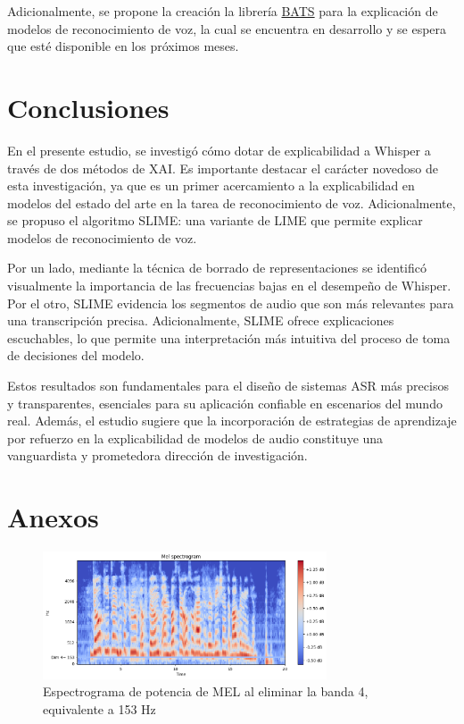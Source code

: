 \documentclass[conference]{IEEEtran}
\begin{document}
Adicionalmente, se propone la creación la librería \href{https://github.com/diegoquezadac/BATS}{BATS} para la explicación de modelos de reconocimiento de voz, la cual se encuentra en desarrollo y se espera que esté disponible en los próximos meses.

\section{Conclusiones} \label{8-Conclusions}

En el presente estudio, se investigó cómo dotar de explicabilidad a Whisper a través de dos métodos de XAI. Es importante destacar el carácter novedoso de esta investigación, ya que es un primer acercamiento a la explicabilidad en modelos del estado del arte en la tarea de reconocimiento de voz. Adicionalmente, se propuso el algoritmo SLIME: una variante de LIME que permite explicar modelos de reconocimiento de voz.

Por un lado, mediante la técnica de borrado de representaciones se identificó visualmente la importancia de las frecuencias bajas en el desempeño de Whisper. Por el otro, SLIME evidencia los segmentos de audio que son más relevantes para una transcripción precisa. Adicionalmente, SLIME ofrece explicaciones escuchables, lo que permite una interpretación más intuitiva del proceso de toma de decisiones del modelo.

Estos resultados son fundamentales para el diseño de sistemas ASR más precisos y transparentes, esenciales para su aplicación confiable en escenarios del mundo real. Además, el estudio sugiere que la incorporación de estrategias de aprendizaje por refuerzo en la explicabilidad de modelos de audio constituye una vanguardista y prometedora dirección de investigación.

\printbibliography

\section{Anexos} \label{9-Anexos}
\begin{figure}[h]
\centering
\includegraphics[width=0.75\textwidth]{images/dim_4_erasured.png}
\caption{Espectrograma de potencia de MEL al eliminar la banda 4, equivalente a 153 Hz}
\end{figure}
\end{document}
